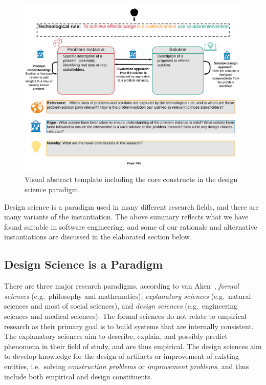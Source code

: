 \documentclass[graybox]{svmult}
\newcommand{\emelie}[1]{\textcolor{red}{{\it [Emelie says: #1]}}}
\newcommand{\per}[1]{\textcolor{cyan}{{\it [Per says: #1]}}}
\newcommand{\emelie}[1]{}
\newcommand{\per}[1]{}
\begin{document}
\begin{figure}
  \includegraphics[width=1.0\textwidth]{Figures/GenericVA.png}
\caption{Visual abstract template including the core constructs in the design science paradigm.}
\label{fig:VA-template}       %
\end{figure}


Design science is a paradigm used in many different research fields, and there are many variants of the instantiation. The above summary reflects what we have found suitable in software engineering, and some of our rationale and alternative instantiations are discussed in the elaborated section below.


\subsection{Design Science is a Paradigm}
There are three major research paradigms, according to van Aken~\cite{van_aken_management_2004}, \emph{formal sciences} (e.g.\ philosophy and mathematics), \emph{explanatory sciences} (e.g.\ natural sciences and most of social sciences), and \emph{design sciences} (e.g.\ engineering sciences and medical sciences).  The formal sciences do not relate to empirical research as their primary goal is to build systems that are internally consistent. The explanatory sciences aim to describe, explain, and possibly predict phenomena in their field of study, and are thus empirical. The design sciences aim to develop knowledge for the design of artifacts or improvement of existing entities, i.e.\ solving \emph{construction problems} or  \emph{improvement problems}, and thus include both empirical and design constituents.
\end{document}
